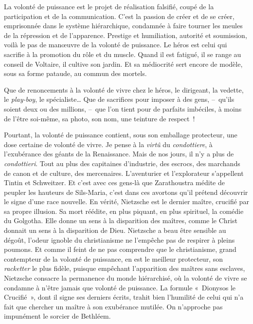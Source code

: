 \documentclass[french,twoside]{book} %
\newcommand{\astermono}{\medskip\centerline{\color{rubric}\large\selectfont{\syms ✻}}\medskip\par}%
\begin{document}
\astermono

\noindent La volonté de puissance est le projet de réalisation falsifié, coupé de la participation et de la communication. C’est la passion de créer et de se créer, emprisonnée dans le système hiérarchique, condamnée à faire tourner les meules de la répression et de l’apparence. Prestige et humiliation, autorité et soumission, voilà le pas de manœuvre de la volonté de puissance. Le héros est celui qui sacrifie à la promotion du rôle et du muscle. Quand il est fatigué, il se range au conseil de Voltaire, il cultive son jardin. Et sa médiocrité sert encore de modèle, sous sa forme pataude, au commun des mortels.\par
Que de renoncements à la volonté de vivre chez le héros, le dirigeant, la vedette, le \emph{play-boy}, le spécialiste… Que de sacrifices pour imposer à des gens, – qu’ils soient deux ou des millions, – que l’on tient pour de parfaits imbéciles, à moins de l’être soi-même, sa photo, son nom, une teinture de respect !\par
Pourtant, la volonté de puissance contient, sous son emballage protecteur, une dose certaine de volonté de vivre. Je pense à la \emph{virtû} du \emph{condottiere}, à l’exubérance des géants de la Renaissance. Mais de nos jours, il n’y a plus de \emph{condottieri}. Tout au plus des capitaines d’industrie, des escrocs, des marchands de canon et de culture, des mercenaires. L’aventurier et l’explorateur s’appellent Tintin et Schweitzer. Et c’est avec ces gens-là que Zarathoustra médite de peupler les hauteurs de Sils-Maria, c’est dans ces avortons qu’il prétend découvrir le signe d’une race nouvelle. En vérité, Nietzsche est le dernier maître, crucifié par sa propre illusion. Sa mort réédite, en plus piquant, en plus spirituel, la comédie du Golgotha. Elle donne un sens à la disparition des maîtres, comme le Christ donnait un sens à la disparition de Dieu. Nietzsche a beau être sensible au dégoût, l’odeur ignoble du christianisme ne l’empêche pas de respirer à pleins poumons. Et comme il feint de ne pas comprendre que le christianisme, grand contempteur de la volonté de puissance, en est le meilleur protecteur, son \emph{racketter} le plus fidèle, puisque empêchant l’apparition des maîtres sans esclaves, Nietzsche consacre la permanence du monde hiérarchisé, où la volonté de vivre se condamne à n’être jamais que volonté de puissance. La formule « Dionysos le Crucifié », dont il signe ses derniers écrits, trahit bien l’humilité de celui qui n’a fait que chercher un maître à son exubérance mutilée. On n’approche pas impunément le sorcier de Bethléem.\par
\end{document}
